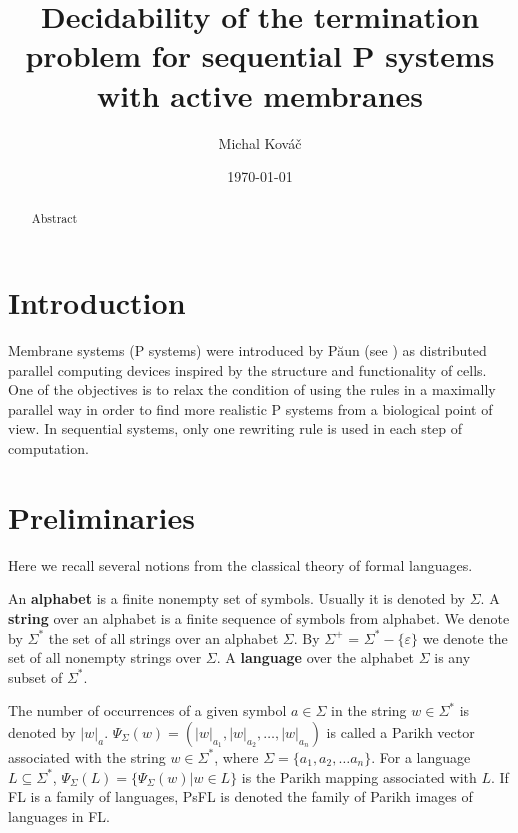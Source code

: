 \documentclass[llncs,submission,copyright,creativecommons]{../lib/lncs/llncs}
\def\eps{\varepsilon}
\begin{document}
\title{Decidability of the termination problem for sequential P systems with active membranes}
\author{Michal Kováč}
\date{\today}
\maketitle

\begin{abstract}
Abstract
\end{abstract}

\section{Introduction}
\label{sec:introduction}


Membrane systems (P systems) were introduced by P\u{a}un (see \cite{Paun2000108}) as distributed parallel computing devices inspired by the structure and functionality of cells.
One of the objectives is to relax the condition of using the rules in a maximally parallel way in order to find more realistic P systems from a biological point of view.
In sequential systems, only one rewriting rule is used in each step of computation.


\section{Preliminaries}
\label{sec:preliminaries}

Here we recall several notions from the classical theory of formal languages.

An {\bf alphabet} is a finite nonempty set of symbols. Usually it is denoted by $\Sigma$. A {\bf string} over an alphabet is a finite sequence of symbols from alphabet. We denote by $\Sigma^*$ the set of all strings over an alphabet $\Sigma$. By $\Sigma^+$ = $\Sigma^* - \{\eps\}$ we denote the set of all nonempty strings over $\Sigma$. A {\bf language} over the alphabet $\Sigma$ is any subset of $\Sigma^*$.

The number of occurrences of a given symbol $a\in \Sigma$ in the string $w\in \Sigma^*$ is denoted by $|w|_a$. $\Psi_\Sigma(w)=(|w|_{a_1},|w|_{a_2},\dots,|w|_{a_n})$ is called a Parikh vector associated with the string $w\in \Sigma^*$, where $\Sigma=\{a_1,a_2,\dots a_n\}$. For a language $L\subseteq \Sigma^*$, $\Psi_\Sigma(L)=\{\Psi_\Sigma(w)|w\in L\}$ is the Parikh mapping associated with $L$. If FL is a family of languages, PsFL is denoted the family of Parikh images of languages in FL.
\end{document}

